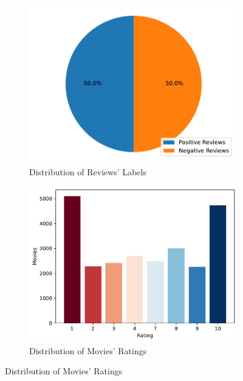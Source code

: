 \begin{figure}
    \centering

    \begin{subfigure}{0.48\textwidth}
        \centering
        \includegraphics[width=\linewidth]{figures/train_labels.pdf}
        \caption{Distribution of Reviews' Labels}
        \label{fig:labels}
    \end{subfigure}
    \begin{subfigure}{0.48\textwidth}
        \centering
        \includegraphics[width=\linewidth]{figures/train_ratings.pdf}
        \caption{Distribution of Movies' Ratings}
        \label{fig:ratings}
    \end{subfigure}


\end{figure}

